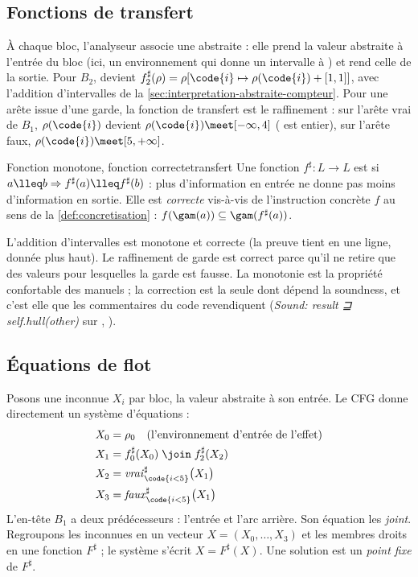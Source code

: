 \subsection{Fonctions de transfert}

À chaque bloc, l'analyseur associe une 
abstraite : elle prend la valeur abstraite à l'entrée du bloc (ici, un
environnement qui donne un intervalle à ) et rend celle de la
sortie. Pour $B_2$,  devient
$f_2^\sharp(\rho) = \rho[\code{i} \mapsto \rho(\code{i}) + [1,1]]$, avec
l'addition d'intervalles de la \cref{sec:interpretation-abstraite-compteur}.
Pour une arête issue d'une garde, la fonction de transfert est le
raffinement : sur l'arête \og vrai\fg{} de $B_1$, $\rho(\code{i})$ devient
$\rho(\code{i}) \meet [-\infty, 4]$ ( est entier), sur l'arête
\og faux\fg{}, $\rho(\code{i}) \meet [5, +\infty]$.

\begin{definition}{Fonction monotone, fonction correcte}{transfert}
  Une fonction $f^\sharp : L \to L$ est  si
  $a \lleq b \Rightarrow f^\sharp(a) \lleq f^\sharp(b)$ : plus d'information en
  entrée ne donne pas moins d'information en sortie. Elle est
  \emph{correcte} vis-à-vis de l'instruction concrète $f$ au sens de la
  \cref{def:concretisation} : $f(\gam(a)) \subseteq \gam(f^\sharp(a))$.
\end{definition}

L'addition d'intervalles est monotone et correcte (la preuve tient en une
ligne, donnée plus haut). Le raffinement de garde est correct parce qu'il ne
retire que des valeurs pour lesquelles la garde est fausse. La monotonie
est la propriété confortable des manuels ; la correction est la seule dont
dépend la soundness, et c'est elle que les commentaires du code revendiquent
(\og \emph{Sound: result ⊒ self.hull(other)}\fg{} sur
, ).

\subsection{Équations de flot}

Posons une inconnue $X_i$ par bloc, la valeur abstraite à son entrée. Le CFG
donne directement un système d'équations :
\[
\begin{aligned}
  X_0 &= \rho_0 \quad \text{(l'environnement d'entrée de l'effet)}\\
  X_1 &= f_0^\sharp(X_0) \;\join\; f_2^\sharp(X_2)\\
  X_2 &= \mathit{vrai}^\sharp_{\code{i<5}}\big(X_1\big)\\
  X_3 &= \mathit{faux}^\sharp_{\code{i<5}}\big(X_1\big)
\end{aligned}
\]
L'en-tête $B_1$ a deux prédécesseurs : l'entrée et l'arc arrière. Son
équation les \emph{joint}. Regroupons les inconnues en un vecteur
$X = (X_0, \dots, X_3)$ et les membres droits en une fonction $F^\sharp$ ; le
système s'écrit $X = F^\sharp(X)$. Une solution est un \emph{point fixe} de
$F^\sharp$.

